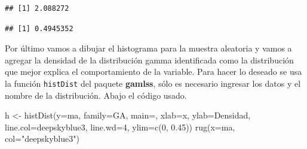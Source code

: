 \documentclass[
]{book}
\makeatletter
\newenvironment{Shaded}{\begin{snugshade}}{\end{snugshade}}
\newcommand{\AttributeTok}[1]{\textcolor[rgb]{0.77,0.63,0.00}{#1}}
\newcommand{\DecValTok}[1]{\textcolor[rgb]{0.00,0.00,0.81}{#1}}
\newcommand{\FloatTok}[1]{\textcolor[rgb]{0.00,0.00,0.81}{#1}}
\newcommand{\FunctionTok}[1]{\textcolor[rgb]{0.00,0.00,0.00}{#1}}
\newcommand{\NormalTok}[1]{#1}
\newcommand{\OtherTok}[1]{\textcolor[rgb]{0.56,0.35,0.01}{#1}}
\newcommand{\SpecialCharTok}[1]{\textcolor[rgb]{0.00,0.00,0.00}{#1}}
\newcommand{\StringTok}[1]{\textcolor[rgb]{0.31,0.60,0.02}{#1}}
\newenvironment{kframe}{%
\medskip{}
\setlength{\fboxsep}{.8em}
 \def\at@end@of@kframe{}%
 \ifinner\ifhmode%
  \def\at@end@of@kframe{\end{minipage}}%
  \begin{minipage}{\columnwidth}%
 \fi\fi%
 \def\FrameCommand##1{\hskip\@totalleftmargin \hskip-\fboxsep
 \colorbox{shadecolor}{##1}\hskip-\fboxsep
     \hskip-\linewidth \hskip-\@totalleftmargin \hskip\columnwidth}%
 \MakeFramed {\advance\hsize-\width
   \@totalleftmargin\z@ \linewidth\hsize
   \@setminipage}}%
 {\par\unskip\endMakeFramed%
 \at@end@of@kframe}
\renewenvironment{Shaded}{\begin{kframe}}{\end{kframe}}
\makeatother
\begin{document}
\begin{Shaded}
\end{Shaded}

\begin{verbatim}
## [1] 2.088272
\end{verbatim}

\begin{Shaded}
\end{Shaded}

\begin{verbatim}
## [1] 0.4945352
\end{verbatim}

Por último vamos a dibujar el histograma para la muestra aleatoria y vamos a agregar la densidad de la distribución gamma identificada como la distribución que mejor explica el comportamiento de la variable. Para hacer lo deseado se usa la función \texttt{histDist} del paquete \textbf{gamlss}, sólo es necesario ingresar los datos y el nombre de la distribución. Abajo el código usado.

\begin{Shaded}
\begin{Highlighting}[]
\NormalTok{h }\OtherTok{\textless{}{-}} \FunctionTok{histDist}\NormalTok{(}\AttributeTok{y=}\NormalTok{ma, }\AttributeTok{family=}\NormalTok{GA, }\AttributeTok{main=}\StringTok{\textquotesingle{}\textquotesingle{}}\NormalTok{, }\AttributeTok{xlab=}\StringTok{\textquotesingle{}x\textquotesingle{}}\NormalTok{, }\AttributeTok{ylab=}\StringTok{\textquotesingle{}Densidad\textquotesingle{}}\NormalTok{,}
              \AttributeTok{line.col=}\StringTok{\textquotesingle{}deepskyblue3\textquotesingle{}}\NormalTok{, }\AttributeTok{line.wd=}\DecValTok{4}\NormalTok{, }\AttributeTok{ylim=}\FunctionTok{c}\NormalTok{(}\DecValTok{0}\NormalTok{, }\FloatTok{0.45}\NormalTok{))}
\FunctionTok{rug}\NormalTok{(}\AttributeTok{x=}\NormalTok{ma, }\AttributeTok{col=}\StringTok{"deepskyblue3"}\NormalTok{)}
\end{Highlighting}
\end{Shaded}
\end{document}

